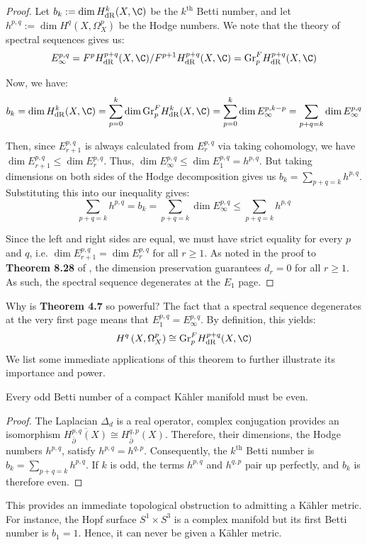 \begin{proof}
        Let $b_k:=\dim H_\mathrm{dR}^k(X,\C)$ be the $k^\text{th}$ Betti number, and let $h^{p,q}:=\dim H^q\left(X,\Omega_X^p\right)$ be the Hodge numbers. We note that the theory of spectral sequences gives us:
        $$
        E_\infty^{p,q} = F^p H_\mathrm{dR}^{p+q}(X,\C) / F^{p+1} H_\mathrm{dR}^{p+q}(X,\C) = \mathrm{Gr}^F_p H_\mathrm{dR}^{p+q}(X,\C)
        $$
        
        \noindent Now, we have:
        $$
        b_k = \dim H_\mathrm{dR}^k(X,\C) = \sum_{p=0}^k\dim \mathrm{Gr}^F_p H_\mathrm{dR}^k(X,\C) = \sum_{p=0}^k\dim E^{p,k-p}_\infty = \sum_{p+q=k} \dim E_\infty^{p,q}
        $$
        
        \noindent Then, since $E_{r+1}^{p,q}$ is always calculated from $E_r^{p,q}$ via taking cohomology, we have $\dim E_{r+1}^{p,q} \leq \dim E_r^{p,q}$. Thus, $\dim E_\infty^{p,q} \leq \dim E_1^{p,q} = h^{p,q}$. But taking dimensions on both sides of the Hodge decomposition gives us $b_k = \sum_{p+q=k} h^{p,q}$. Substituting this into our inequality gives:
        $$
        \sum_{p+q=k} h^{p,q} = b_k = \sum_{p+q=k} \dim E_\infty^{p,q} \leq \sum_{p+q=k} h^{p,q}
        $$
        
        \noindent Since the left and right sides are equal, we must have strict equality for every $p$ and $q$, i.e. $\dim E_{r+1}^{p,q} = \dim E_r^{p,q}$ for all $r\geq 1$. As noted in the proof to \textbf{Theorem 8.28} of \cite{VoisinI2002}, the dimension preservation guarantees $d_r = 0$ for all $r\geq 1$. As such, the spectral sequence degenerates at the $E_1$ page.
\end{proof}

\noindent Why is \textbf{Theorem 4.7} so powerful? The fact that a spectral sequence degenerates at the very first page means that $E_1^{p,q} = E_\infty^{p,q}$. By definition, this yields:
$$
H^q\left(X,\Omega_X^p\right) \cong \mathrm{Gr}^F_p H^{p+q}_\mathrm{dR}(X,\C)
$$
We list some immediate applications of this theorem to further illustrate its importance and power. 

\begin{corollary}
    Every odd Betti number of a compact K\"ahler manifold must be even.
\end{corollary}

\begin{proof}
    The Laplacian $\Delta_d$ is a real operator, complex conjugation provides an isomorphism $\overline{H_{\bar{\partial}}^{p,q}(X)} \cong H_{\bar{\partial}}^{q,p}(X)$. Therefore, their dimensions, the Hodge numbers $h^{p,q}$, satisfy $h^{p,q} = h^{q,p}$. Consequently, the $k^\text{th}$ Betti number is $b_k = \sum_{p+q=k} h^{p,q}$. If $k$ is odd, the terms $h^{p,q}$ and $h^{q,p}$ pair up perfectly, and $b_k$ is therefore even.
\end{proof}
\noindent This provides an immediate topological obstruction to admitting a K\"ahler metric. For instance, the Hopf surface $S^1 \times S^3$ is a complex manifold but its first Betti number is $b_1=1$. Hence, it can never be given a K\"ahler metric.

